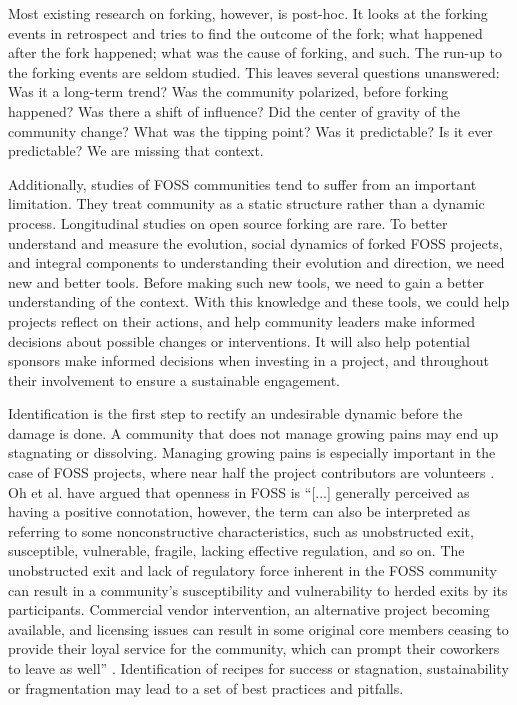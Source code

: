 \documentclass[12pt]{report}
\begin{document}
Most existing research on forking, however, is post-hoc. It looks at the forking events in retrospect and tries to find the outcome of the fork; what happened after the fork happened; what was the cause of forking, and such. The run-up to the forking events are seldom studied. This leaves several questions unanswered: Was it a long-term trend? Was the community polarized, before forking happened? Was there a shift of influence? Did the center of gravity of the community change? What was the tipping point? Was it predictable? Is it ever predictable? We are missing that context. 

Additionally, studies of FOSS communities tend to suffer from an important limitation. They treat community as a static structure rather than a dynamic process. Longitudinal studies on open source forking are rare. To better understand and measure the evolution, social dynamics of forked FOSS projects, and integral components to understanding their evolution and direction, we need new and better tools. Before making such new tools, we need to gain a better understanding of the context. With this knowledge and these tools, we could help projects reflect on their actions, and help community leaders make informed decisions about possible changes or interventions. It will also help potential sponsors make informed decisions when investing in a project, and throughout their involvement to ensure a sustainable engagement. 

Identification is the first step to rectify an undesirable dynamic before the damage is done. A community that does not manage growing pains may end up stagnating or dissolving. Managing growing pains is especially important in the case of FOSS projects, where near half the project contributors are volunteers \cite{Forrest}. Oh et al. \cite{Oh} have argued that openness in FOSS is ``[...] generally perceived as having a positive connotation, however, the term can also be interpreted as referring to some nonconstructive characteristics, such as unobstructed exit, susceptible, vulnerable, fragile, lacking effective regulation, and so on. The unobstructed exit and lack of regulatory force inherent in the FOSS community can result in a community's susceptibility and vulnerability to herded exits by its participants. Commercial vendor intervention, an alternative project becoming available, and licensing issues can result in some original core members ceasing to provide their loyal service for the community, which can prompt their coworkers to leave as well'' \cite{Oh}. Identification of recipes for success or stagnation, sustainability or fragmentation may lead to a set of best practices and pitfalls.
\end{document}

